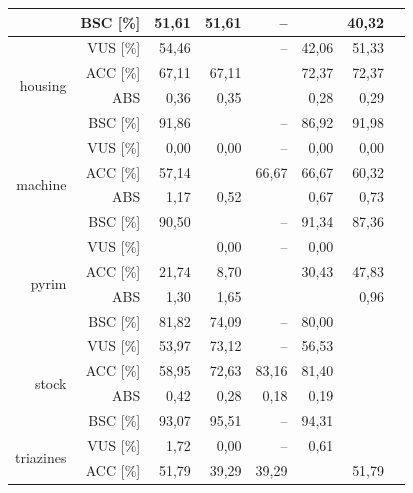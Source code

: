 \documentclass{mini}
\begin{document}
\begin{table}[!htbp]
\begin{tabular}{rrrrrrrr}
   & BSC [\%] & 51,61 & 51,61 & -- & \color{red}{72,58} & 40,32 &\color{gray}{48,39}\\ 
   \hline
\multirow{4}{15mm}{housing} & VUS [\%] & 54,46 & \color{red}{55,31} & -- & 42,06 & 51,33 &\color{gray}{0,02}\\ 
   & ACC [\%] & 67,11 & 67,11 & \color{red}{75,00} & 72,37 & 72,37 &\color{gray}{65,13}\\ 
   & ABS \color{white}{[\%]} & 0,36 & 0,35 & \color{red}{0,26} & 0,28 & 0,29 &\color{gray}{0,40}\\ 
   & BSC [\%] & 91,86 & \color{red}{92,25} & -- & 86,92 & 91,98 &\color{gray}{51,15}\\ 
   \hline
\multirow{4}{15mm}{machine} & VUS [\%] & 0,00 & 0,00 & -- & 0,00 & 0,00 &\color{gray}{0,00}\\ 
   & ACC [\%] & 57,14 & \color{red}{68,25} & 66,67 & 66,67 & 60,32 &\color{gray}{69,84}\\ 
   & ABS \color{white}{[\%]} & 1,17 & 0,52 & \color{red}{0,51} & 0,67 & 0,73 &\color{gray}{0,48}\\ 
   & BSC [\%] & 90,50 & \color{red}{92,87} & -- & 91,34 & 87,36 &\color{gray}{29,20}\\ 
   \hline
\multirow{4}{15mm}{pyrim} & VUS [\%] & \color{red}{0,74} & 0,00 & -- & 0,00 & \color{red}{0,74} &\color{gray}{0,00}\\ 
   & ACC [\%] & 21,74 & 8,70 & \color{red}{52,17} & 30,43 & 47,83 &\color{gray}{47,83}\\ 
   & ABS \color{white}{[\%]} & 1,30 & 1,65 & \color{red}{0,91} & \color{red}{0,91} & 0,96 &\color{gray}{0,87}\\ 
   & BSC [\%] & 81,82 & 74,09 & -- & 80,00 & \color{red}{82,73} &\color{gray}{61,82}\\ 
   \hline
\multirow{4}{15mm}{stock} & VUS [\%] & 53,97 & 73,12 & -- & 56,53 & \color{red}{96,01} &\color{gray}{0,01}\\ 
   & ACC [\%] & 58,95 & 72,63 & 83,16 & 81,40 & \color{red}{91,58} &\color{gray}{86,67}\\ 
   & ABS \color{white}{[\%]} & 0,42 & 0,28 & 0,18 & 0,19 & \color{red}{0,08} &\color{gray}{0,14}\\ 
   & BSC [\%] & 93,07 & 95,51 & -- & 94,31 & \color{red}{99,42} &\color{gray}{50,69}\\ 
   \hline
\multirow{4}{15mm}{triazines} & VUS [\%] & 1,72 & 0,00 & -- & 0,61 & \color{red}{1,83}&\color{gray}{0,00} \\ 
   & ACC [\%] & 51,79 & 39,29 & 39,29 & \color{red}{53,57} & 51,79 &\color{gray}{44,64}\\ 

\end{tabular}
\end{table}
\end{document}
